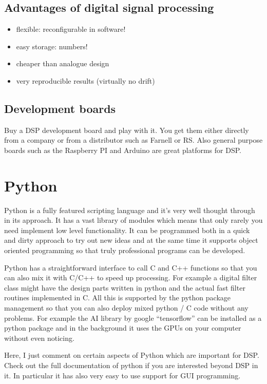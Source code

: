 \documentclass[12pt,a4paper]{article}
\begin{document}
\subsection{Advantages of digital signal processing}
\begin{itemize}
\item flexible: reconfigurable in software!
\item easy storage: numbers!
\item cheaper than analogue design
\item very reproducible results (virtually no drift)
\end{itemize}

\subsection{Development boards}
Buy a DSP development board and play with it. You get them either
directly from a company or from a distributor such as Farnell or RS.
Also general purpose boards such as the Raspberry PI and Arduino are great
platforms for DSP.

\section{Python}
Python is a fully featured scripting language and it's very well
thought through in its approach. It has a vast library of modules
which means that only rarely you need implement low level
functionality. It can be programmed both in a quick and dirty approach
to try out new ideas and at the same time it supports object oriented
programming so that truly professional programs can be
developed.

Python has a straightforward interface to call C and C++ functions so
that you can also mix it with C/C++ to speed up processing. For
example a digital filter class might have the design parts written in python
and the actual fast filter routines implemented in C. All this is
supported by the python package management so that you can also deploy
mixed python / C code without any problems. For example the AI library by
google ``tensorflow'' can be installed as a python package and in the
background it uses the GPUs on your computer without even noticing.

Here, I just comment on certain aspects of Python which are
important for DSP. Check out the full documentation of python
if you are interested beyond DSP in it. In particular it has
also very easy to use support for GUI programming.
\end{document}
